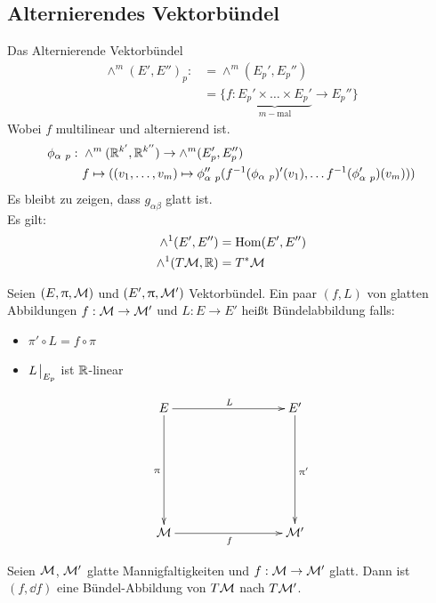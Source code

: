 \subsection{Alternierendes Vektorbündel}
Das Alternierende Vektorbündel
\begin{align*}
\wedge^m (E', E'')_p :&= \wedge^m (E_{p}', E_{p}'')\\
&= \{ f: \underbrace{E_{p}' \times \dots \times E_{p}'}_{m-\mathrm{mal}} \to E_{p}'' \}
\end{align*}
Wobei $f$ multilinear und alternierend ist. 
\begin{align*}
\phi_{\alpha \ p}: \ &\wedge^m (\mathbb{R}^{k'}, \mathbb{R}^{k''}) \to \wedge^m (E_{p}', E_{p} '') \\
&f \mapsto ((v_1, \dots, v_m) \mapsto \phi_{\alpha \ p} '' (f^{-1}(\phi_{\alpha \ p}) ' (v_1), \dots f^{-1}(\phi_{\alpha \ p}') (v_m)))
\end{align*}
Es bleibt zu zeigen, dass $g_{\alpha \beta}$ glatt ist.\\
Es gilt: 
\begin{align*}
\wedge^1 (E', E'') &= \mathrm{Hom}(E', E'')\\
\wedge^1 (T\mathcal{M}, \mathbb{R}) &= T^{*}\mathcal{M}
\end{align*}

\begin{defs}
Seien $(E, \uppi, \mathcal{M})$ und $(E', \uppi, \mathcal{M}')$ Vektorbündel.
Ein paar $(f, L)$ von glatten Abbildungen $f: \mathcal{M} \to \mathcal{M}'$ und $L: E \to E'$ heißt Bündelabbildung falls:
\begin{itemize}
\item $\pi' \circ L = f \circ \pi$
\item $L\eval_{E_p}$ ist $\mathbb{R}$-linear
\end{itemize}


\begin{align}
\begin{xy}
  \xymatrix@=0.25\linewidth{
      E \ar[r]^L \ar[d]_\pi    &   E' \ar[d]^{\pi '}  \\
      \mfk \ar[r]_f             &   \mfk'   
  }
\end{xy}
\end{align}
\end{defs}

\begin{bsp}
Seien $\mathcal{M}$, $\mathcal{M}'$ glatte Mannigfaltigkeiten und $f:\mathcal{M} \to \mathcal{M}'$ glatt.
Dann ist $(f, \dd f)$ eine Bündel-Abbildung von $T\mathcal{M}$ nach $T\mathcal{M}'$.
\end{bsp}

